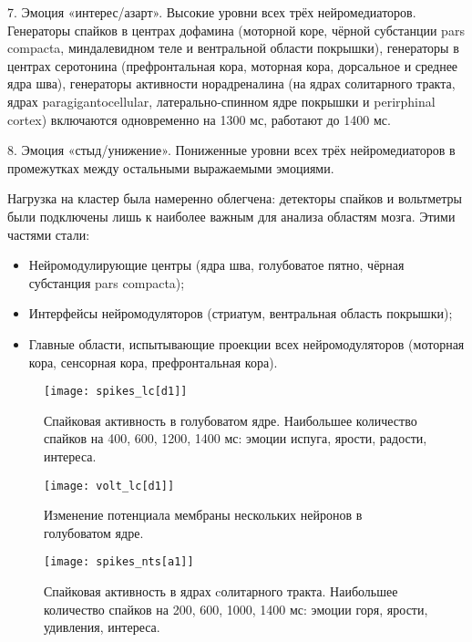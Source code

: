 7. Эмоция «интерес/азарт». Высокие уровни всех трёх нейромедиаторов. Генераторы спайков в центрах дофамина (моторной коре, чёрной субстанции pars compacta, миндалевидном теле и вентральной области покрышки), генераторы в центрах серотонина (префронтальная кора, моторная кора, дорсальное и среднее ядра шва), генераторы активности норадреналина (на ядрах солитарного тракта, ядрах paragigantocellular, латерально-спинном ядре покрышки и perirphinal cortex) включаются одновременно на 1300 мс, работают до 1400 мс.


8. Эмоция «стыд/унижение». Пониженные уровни всех трёх нейромедиаторов в промежутках между остальными выражаемыми эмоциями.


Нагрузка на кластер была намеренно облегчена: детекторы спайков и вольтметры были подключены лишь к наиболее важным для анализа областям мозга. Этими частями стали: \begin{itemize}
\item Нейромодулирующие центры (ядра шва, голубоватое пятно, чёрная субстанция pars compacta);
\item Интерфейсы нейромодуляторов (стриатум, вентральная область покрышки);
\item Главные области, испытывающие проекции всех нейромодуляторов (моторная кора, сенсорная кора, префронтальная кора).
\end{itemize}



\begin{figure}
	\centering
	\texttt{[image: spikes\_lc[d1]]}
	\caption{Спайковая активность в голубоватом ядре. Наибольшее количество спайков на 400, 600, 1200, 1400 мс: эмоции испуга, ярости, радости, интереса.}
	\label{fig:spikes_lc}
\end{figure}

\begin{figure}
	\centering
	\texttt{[image: volt\_lc[d1]]}
	\caption{Изменение потенциала мембраны нескольких нейронов в голубоватом ядре.}
	\label{fig:volt_lc}
\end{figure}

\begin{figure}
	\centering
	\texttt{[image: spikes\_nts[a1]]}
	\caption{Спайковая активность в ядрах cолитарного тракта. Наибольшее количество спайков на 200, 600, 1000, 1400 мс: эмоции горя, ярости, удивления, интереса.}
	\label{fig:spikes_nts}
\end{figure}


